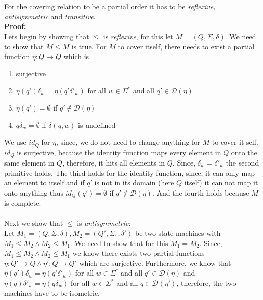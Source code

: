 \documentclass[a4paper,12pt,numbers=noenddot]{scrreport}
\begin{document}
\section{}
For the covering relation to be a partial order it has to be \textit{reflexive, antisymmetric} and \textit{transitive}.\\
\textbf{Proof:}\\
Lets begin by showing that $\le$ is \textit{reflexive}, for this let $M = (Q, \Sigma, \delta)$. We need to show that $M \le M$ is true. For $M$ to cover itself, there needs to exist a partial function $\eta: Q \rightarrow Q$ which is \begin{enumerate}
    \item surjective
    \item $\eta(q')\delta_w = \eta(q'\delta'_w)$ for all $w \in \Sigma^*$ and all $q' \in \mathcal{D}(\eta)$
    \item $\eta(q') = \emptyset$ if $q' \notin \mathcal{D}(\eta)$
    \item $q\delta_w = \emptyset$ if $ \delta(q, w)$ is undefined
\end{enumerate}
We use $id_Q$ for $\eta$, since, we do not need to change anything for $M$ to cover it self. $id_Q$ is surjective, because the identity function maps every element in $Q$ onto the same element in $Q$, therefore, it hits all elements in $Q$. Since, $\delta_w = \delta'_w$ the second primitive holds. The third holds for the identity function, since, it can only map an element to itself and if $q'$ is not in its domain (here $Q$ itself) it can not map it onto anything thus $id_Q(q') = \emptyset$ if $q' \notin \mathcal{D}(\eta)$. And the fourth holds because $M$ is complete.\\ \\
Next we show that $\le$ is \textit{antisymmetric}:\\ Let $M_1 = (Q, \Sigma, \delta), M_2=(Q', \Sigma, ,\delta')$ be two state machines with $M_1 \le M_2 \land M_2 \le M_1$. We need to show that for this $M_1 = M_2$. Since, $M_1 \le M_2 \land M_2 \le M_1$ we know there exists two partial functions $\eta : Q' \rightarrow Q \land \eta' : Q \rightarrow Q'$ which are surjective. Furthermore, we know that 
$\eta(q')\delta_w = \eta(q'\delta'_w) $ for all $ w\in \Sigma^* $ and all $ q' \in \mathcal{D}(\eta)$ and $\eta(q)\delta'_w = \eta(q\delta_w)$ for all $w \in \Sigma^*$ and all $q \in \mathcal{D}(\eta')$, therefore, the two machines have to be isometric.\\
\end{document}
